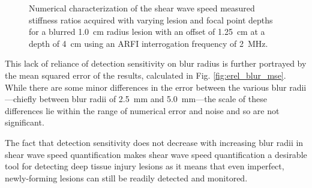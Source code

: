 			\begin{figure}[!htb]
				\centering
				\caption[Numerical characterization of shear wave speed measured stiffness ratio with blurred lesions]{Numerical characterization of the shear wave speed measured stiffness ratios acquired with varying lesion and focal point depths for a blurred \SI{1.0}{cm} radius lesion with an offset of \SI{1.25}{\cm} at a depth of \SI{4}{\cm} using an ARFI interrogation frequency of \SI{2}{\MHz}.}
				\label{fig:erel_blur}
			\end{figure}

			This lack of reliance of detection sensitivity on blur radius is further portrayed by the mean squared error of the results, calculated in Fig. \ref{fig:erel_blur_mse}. While there are some minor differences in the error between the various blur radii---chiefly between blur radii of \SI{2.5}{\mm} and \SI{5.0}{\mm}---the scale of these differences lie within the range of numerical error and noise and so are not significant.

			The fact that detection sensitivity does not decrease with increasing blur radii in shear wave speed quantification makes shear wave speed quantification a desirable tool for detecting deep tissue injury lesions as it means that even imperfect, newly-forming lesions can still be readily detected and monitored.

